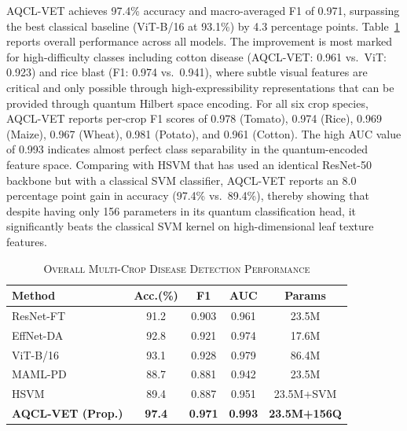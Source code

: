 \documentclass[conference]{IEEEtran}
\begin{document}
AQCL-VET achieves 97.4\% accuracy and macro-averaged F1 of 0.971, surpassing the best classical baseline (ViT-B/16 at 93.1\%) by 4.3 percentage points. Table~\ref{tab:overall} reports overall performance across all models. The improvement is most marked for high-difficulty classes including cotton disease (AQCL-VET: 0.961 vs.\ ViT: 0.923) and rice blast (F1: 0.974 vs.\ 0.941), where subtle visual features are critical and only possible through high-expressibility representations that can be provided through quantum Hilbert space encoding. For all six crop species, AQCL-VET reports per-crop F1 scores of 0.978 (Tomato), 0.974 (Rice), 0.969 (Maize), 0.967 (Wheat), 0.981 (Potato), and 0.961 (Cotton). The high AUC value of 0.993 indicates almost perfect class separability in the quantum-encoded feature space. Comparing with HSVM that has used an identical ResNet-50 backbone but with a classical SVM classifier, AQCL-VET reports an 8.0 percentage point gain in accuracy (97.4\% vs.\ 89.4\%), thereby showing that despite having only 156 parameters in its quantum classification head, it significantly beats the classical SVM kernel on high-dimensional leaf texture features.

\begin{table}[htbp]
\caption{\textsc{Overall Multi-Crop Disease Detection Performance}}
\label{tab:overall}
\centering
\begin{tabular}{lcccc}
\toprule
\textbf{Method} & \textbf{Acc.(\%)} & \textbf{F1} & \textbf{AUC} & \textbf{Params} \\
\midrule
ResNet-FT              & 91.2          & 0.903         & 0.961         & 23.5M           \\
EffNet-DA              & 92.8          & 0.921         & 0.974         & 17.6M           \\
ViT-B/16               & 93.1          & 0.928         & 0.979         & 86.4M           \\
MAML-PD                & 88.7          & 0.881         & 0.942         & 23.5M           \\
HSVM                   & 89.4          & 0.887         & 0.951         & 23.5M+SVM       \\
\textbf{AQCL-VET (Prop.)} & \textbf{97.4} & \textbf{0.971} & \textbf{0.993} & \textbf{23.5M+156Q} \\
\bottomrule
\end{tabular}
\end{table}
\end{document}
